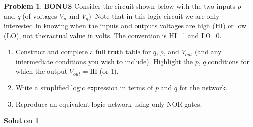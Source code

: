 \documentclass[10pt]{article}
\theoremstyle{definition}
\newtheorem{problem}{Problem}
\newtheorem{soln}{Solution}
\begin{document}
\begin{problem}{\textbf{BONUS}}
Consider the circuit shown below with the two inputs $p$ and $q$ (of voltages $V_p$ and $V_q$). Note that in this logic circuit we are only interested in knowing when the inputs and outputs
voltages are high (HI) or low (LO), not theiractual value in volts. The convention is HI=1 and LO=0.
\begin{enumerate}[label=(\alph*)]
  \item Construct and complete a full truth table for $q$, $p$, and $V_{out}$ (and any intermediate conditions you wish to include). Highlight the $p$, $q$ conditions for which the output $V_{out}=$HI (or 1).
  \item Write a \underline{simplified} logic expression in terms of $p$ and $q$ for the network.
  \item Reproduce an equivalent logic network using only NOR gates.
\end{enumerate}
\end{problem}
\begin{soln} 
\end{soln}
\newpage
\end{document}
